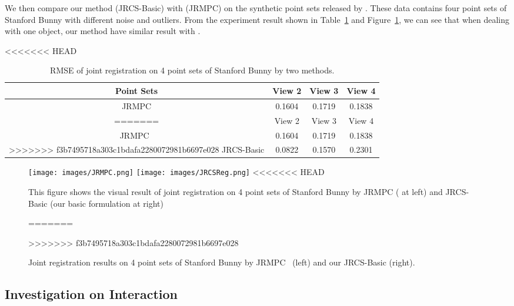 We then compare our method (JRCS-Basic) with \cite{Evangelidis2014}(JRMPC) on the synthetic point sets released by \cite{Evangelidis2014}. These data contains four point sets of Stanford Bunny with different noise and outliers. From the experiment result shown in Table~\ref{tab:reg} and Figure~\ref{fig:reg}, we can see that when dealing with one object, our method have similar result with \cite{Evangelidis2014}.

\begin{table}
	\centering
<<<<<<< HEAD
	\caption{This table shows the RMSE of joint registration on 4 point sets of Stanford Bunny. JRMPC is the method of \cite{Evangelidis2014}. JRCS-Basic is our basic formulation}
	\begin{tabular}{c c c c}
		Point Sets& View 2 & View 3 & View 4 \\
		\hline
		JRMPC & 0.1604 & 0.1719 & 0.1838\\   
=======
	\caption{RMSE of joint registration on 4 point sets of Stanford Bunny by two methods.}
	\begin{tabular}{c c c c}
		Point Sets& View 2 & View 3 & View 4 \\
		\hline
		JRMPC~\cite{Evangelidis2014} & 0.1604 & 0.1719 & 0.1838\\   
>>>>>>> f3b7495718a303c1bdafa2280072981b6697e028
		JRCS-Basic & 0.0822 &  0.1570  & 0.2301\\
	\end{tabular}
	\label{tab:reg}
\end{table}
\begin{figure}[htb]
	\centering
	\texttt{[image: images/JRMPC.png]}
	\texttt{[image: images/JRCSReg.png]}
<<<<<<< HEAD
	\caption{This figure shows the visual result of joint registration on 4 point sets of Stanford Bunny by JRMPC (\cite{Evangelidis2014} at left) and JRCS-Basic (our basic formulation at right)}
=======
	\caption{Joint registration results on 4 point sets of Stanford Bunny by JRMPC~\cite{Evangelidis2014} (left) and our JRCS-Basic (right).}
>>>>>>> f3b7495718a303c1bdafa2280072981b6697e028
	\label{fig:reg}
\end{figure}

\subsection{Investigation on Interaction}
\label{subsec:interact}

